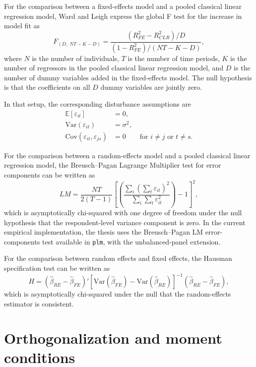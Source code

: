 \documentclass[11pt,oneside,a4paper]{book}
\newcommand{\tocsection}[2]{%
  \section[#1]{#2}%
}
\begin{document}
For the comparison between a fixed-effects model and a pooled classical linear regression model, Ward and Leigh express the global F test for the increase in model fit as
\begin{equation*}
F_{(D,\;NT-K-D)}=
\frac{\left(R^2_{FE}-R^2_{CLR}\right)/D}
{\left(1-R^2_{FE}\right)/(NT-K-D)},
\end{equation*}
where \(N\) is the number of individuals, \(T\) is the number of time periods, \(K\) is the number of regressors in the pooled classical linear regression model, and \(D\) is the number of dummy variables added in the fixed-effects model. The null hypothesis is that the coefficients on all \(D\) dummy variables are jointly zero.

In that setup, the corresponding disturbance assumptions are
\begin{align*}
\mathbb{E}[\varepsilon_{it}] &= 0, \\
\mathrm{Var}(\varepsilon_{it}) &= \sigma^2, \\
\mathrm{Cov}(\varepsilon_{it}, \varepsilon_{js}) &= 0
\qquad \text{for } i \neq j \text{ or } t \neq s.
\end{align*}

For the comparison between a random-effects model and a pooled classical linear regression model, the Breusch--Pagan Lagrange Multiplier test for error components can be written as
\begin{equation*}
LM=
\frac{NT}{2(T-1)}
\left[
\left(
\frac{\sum_i \left(\sum_t \varepsilon_{it}\right)^2}
{\sum_i \sum_t \varepsilon_{it}^2}
\right)
-1
\right]^2,
\end{equation*}
which is asymptotically chi-squared with one degree of freedom under the null hypothesis that the respondent-level variance component is zero. In the current empirical implementation, the thesis uses the Breusch--Pagan LM error-components test available in \texttt{plm}, with the unbalanced-panel extension.

For the comparison between random effects and fixed effects, the Hausman specification test can be written as
\begin{equation*}
H=
\left(\hat{\beta}_{RE}-\hat{\beta}_{FE}\right)'
\left[
\mathrm{Var}\!\left(\hat{\beta}_{FE}\right)
-\mathrm{Var}\!\left(\hat{\beta}_{RE}\right)
\right]^{-1}
\left(\hat{\beta}_{RE}-\hat{\beta}_{FE}\right),
\end{equation*}
which is asymptotically chi-squared under the null that the random-effects estimator is consistent.

\tocsection{Orthogonalization and Moment Conditions}{Orthogonalization and moment conditions}
\label{app:dml_derivations}
\end{document}
